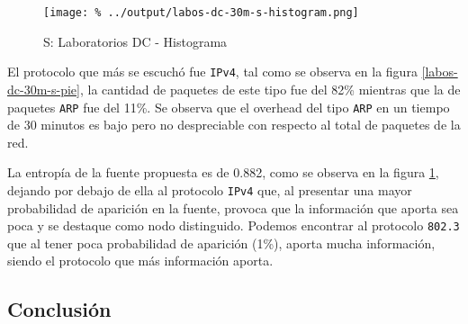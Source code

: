 \documentclass[final,inline,a4paper,narroweqnarray]{ieee}
\begin{document}
    \begin{figure}[ht]\begin{center}
      \texttt{[image: \%
      ../output/labos-dc-30m-s-histogram.png]}
      \caption{S: Laboratorios DC - Histograma}
      \label{labos-dc-30m-s-histogram}
    \end{center}\end{figure}

    El protocolo que más se escuchó fue \texttt{IPv4}, tal como se
    observa en la figura \ref{labos-dc-30m-s-pie}, la cantidad de
    paquetes  de este tipo fue del 82\% mientras que la de paquetes
    \texttt{ARP} fue del 11\%. Se observa que el overhead del tipo
    \texttt{ARP} en un tiempo de 30 minutos es bajo pero no
    despreciable con respecto al total de paquetes de la red.

    La entropía de la fuente propuesta es de 0.882, como se observa en
    la figura \ref{labos-dc-30m-s-histogram}, dejando por debajo de
    ella al protocolo \texttt{IPv4} que, al presentar una mayor
    probabilidad de aparición en la fuente, provoca que la información
    que aporta sea poca y se destaque como nodo distinguido. Podemos
    encontrar al protocolo
    \texttt{802.3} que al tener poca probabilidad de aparición
    (1\%), aporta mucha información, siendo el protocolo que más
    información aporta.

    \subsection{Conclusión}




\end{document}
